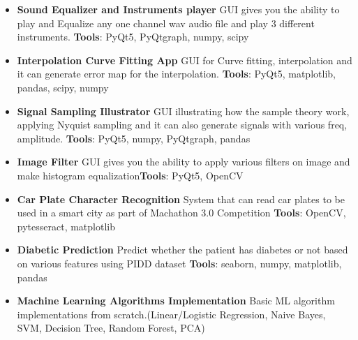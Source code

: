 \begin{itemize}
\item \textbf {Sound Equalizer and Instruments player} \newline 
GUI gives you the ability to play and Equalize any one channel wav audio file and play 3 different instruments. \newline
\textbf {Tools}: PyQt5, PyQtgraph, numpy, scipy
\smallskip
\item \textbf {Interpolation Curve Fitting App} \newline
GUI for Curve fitting, interpolation and it can generate error map for the interpolation.
\newline \textbf {Tools}: PyQt5, matplotlib, pandas, scipy, numpy
\smallskip
\item \textbf {Signal Sampling Illustrator}  \newline
GUI illustrating how the sample theory work, applying Nyquist sampling and it can also generate signals with various freq, amplitude.
\newline \textbf {Tools}: PyQt5, numpy, PyQtgraph, pandas
\smallskip
\end{itemize}
\smallskip

\begin{itemize}
\item \textbf {Image Filter} \newline GUI gives you the ability to apply various filters on image and make histogram equalization\newline \textbf {Tools}: PyQt5, OpenCV
\smallskip
\item \textbf {Car Plate Character Recognition} \newline System that can read car plates to be used in a smart city as part of Machathon 3.0 Competition \newline \textbf {Tools}: OpenCV, pytesseract, matplotlib
\smallskip
\end{itemize}
\smallskip

\begin{itemize}
\item  \textbf {Diabetic Prediction} \newline 
Predict whether the patient has diabetes or not based on various features using PIDD dataset \newline \textbf {Tools}:
seaborn, numpy, matplotlib, pandas 
\smallskip
\item \textbf {Machine Learning Algorithms Implementation} \newline Basic ML algorithm implementations from scratch.(Linear/Logistic Regression, Naive Bayes, SVM, Decision Tree, Random Forest, PCA)
\smallskip
\end{itemize}
\smallskip

